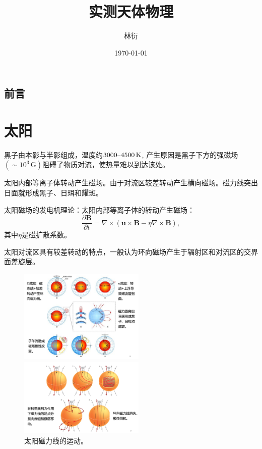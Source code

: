 \documentclass[11pt, a4paper, oneside, onecolumn]{ctexart}
\title{实测天体物理}
\author{林衍}
\date{\today}
\numberwithin{equation}{subsection}
\begin{document}
\maketitle
\subsection*{前言}


\newpage
\tableofcontents

\newpage
\section{太阳}
黑子由本影与半影组成，温度约$3000\text{\textendash}4500\,\mathrm{K}$, 产生原因是黑子下方的强磁场$\left(\sim10^{3}\,\mathrm{G}\right)$阻碍了物质对流，使热量难以到达该处。

太阳内部等离子体转动产生磁场。由于对流区较差转动产生横向磁场。磁力线突出日面就形成黑子、日珥和耀斑。

太阳磁场的发电机理论：太阳内部等离子体的转动产生磁场：
\begin{equation}
\frac{\partial{}\boldsymbol{B}}{\partial{}t}=\nabla\times\left(\boldsymbol{u}\times\boldsymbol{B}-\eta\nabla\times\boldsymbol{B}\right),
\end{equation}
其中$\eta$是磁扩散系数。

太阳对流区具有较差转动的特点，一般认为环向磁场产生于辐射区和对流区的交界面差旋层。
\begin{figure}[!htbp]
\centering
\begin{minipage}[t]{0.45\textwidth}
\includegraphics[width=6cm]{figures/figure1_1.png}
\end{minipage}
\begin{minipage}[t]{0.45\textwidth}
\includegraphics[width=6cm]{figures/figure1_2.png}
\end{minipage}
\captionsetup{justification=raggedright, singlelinecheck=false}
\caption{太阳磁力线的运动。}
\label{太阳磁力线的运动。}
\end{figure}
\end{document}
